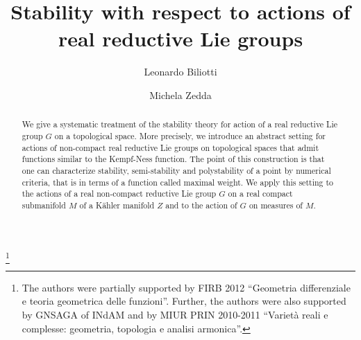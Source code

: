 \documentclass[leqno,11pt, a4]{amsart}
\theoremstyle{named}
\begin{document}
\title{Stability with respect to actions of real reductive Lie groups}
\author{Leonardo Biliotti}
\address{(Leonardo Biliotti) Dipartimento di Matematica e Informatica \\
          Universit\`a di Parma (Italy)}

\author{Michela Zedda}
\address{(Michela Zedda) Dipartimento di Matematica e Fisica ``Ennio De Giorgi'' \\
          Universit\`a del Salento (Italy)}

\begin{abstract}
We give a systematic treatment of the stability theory for action of a real reductive Lie group $G$ on a topological space. More precisely, we introduce an abstract setting for actions of non-compact real reductive Lie groups on topological spaces that admit functions
similar to the  Kempf-Ness function. The point of this construction
is that one can characterize stability, semi-stability and polystability of a point  by numerical criteria, that is in terms of a function called maximal weight. We apply this setting to the actions of a real non-compact reductive Lie group $G$ on a real compact submanifold $M$ of a K\"ahler manifold $Z$ and to the action of $G$ on measures of $M$.
\end{abstract}

\thanks{The authors were partially supported by FIRB 2012 ``Geometria
  differenziale e teoria geometrica delle funzioni''. Further, the authors were also supported by GNSAGA of
  INdAM and by MIUR PRIN  2010-2011
   ``Variet\`a reali e complesse: geometria, topologia e analisi armonica''. }

\maketitle

\tableofcontents
\end{document}
